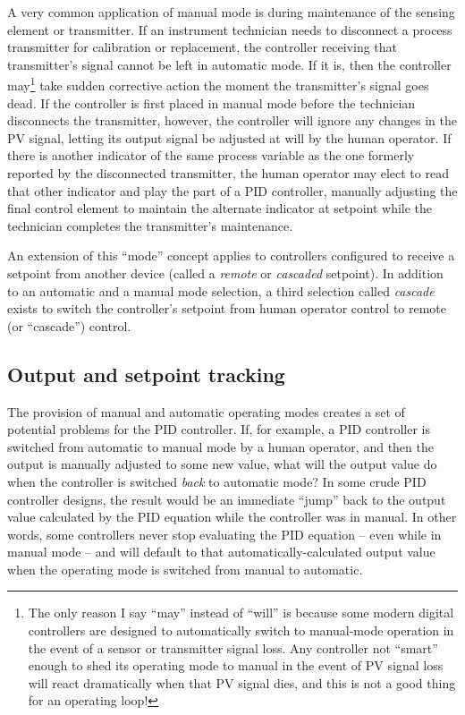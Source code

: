A very common application of manual mode is during maintenance of the sensing element or transmitter.  If an instrument technician needs to disconnect a process transmitter for calibration or replacement, the controller receiving that transmitter's signal cannot be left in automatic mode.  If it is, then the controller may\footnote{The only reason I say ``may'' instead of ``will'' is because some modern digital controllers are designed to automatically switch to manual-mode operation in the event of a sensor or transmitter signal loss.  Any controller not ``smart'' enough to shed its operating mode to manual in the event of PV signal loss will react dramatically when that PV signal dies, and this is not a good thing for an operating loop!} take sudden corrective action the moment the transmitter's signal goes dead.  If the controller is first placed in manual mode before the technician disconnects the transmitter, however, the controller will ignore any changes in the PV signal, letting its output signal be adjusted at will by the human operator.  If there is another indicator of the same process variable as the one formerly reported by the disconnected transmitter, the human operator may elect to read that other indicator and play the part of a PID controller, manually adjusting the final control element to maintain the alternate indicator at setpoint while the technician completes the transmitter's maintenance.

\vskip 10pt

An extension of this ``mode'' concept applies to controllers configured to receive a setpoint from another device (called a \textit{remote} or \textit{cascaded} setpoint).  In addition to an automatic and a manual mode selection, a third selection called \textit{cascade} exists to switch the controller's setpoint from human operator control to remote (or ``cascade'') control.      




\filbreak
\subsection{Output and setpoint tracking}

The provision of manual and automatic operating modes creates a set of potential problems for the PID controller.  If, for example, a PID controller is switched from automatic to manual mode by a human operator, and then the output is manually adjusted to some new value, what will the output value do when the controller is switched \textit{back} to automatic mode?  In some crude PID controller designs, the result would be an immediate ``jump'' back to the output value calculated by the PID equation while the controller was in manual.  In other words, some controllers never stop evaluating the PID equation -- even while in manual mode -- and will default to that automatically-calculated output value when the operating mode is switched from manual to automatic.

